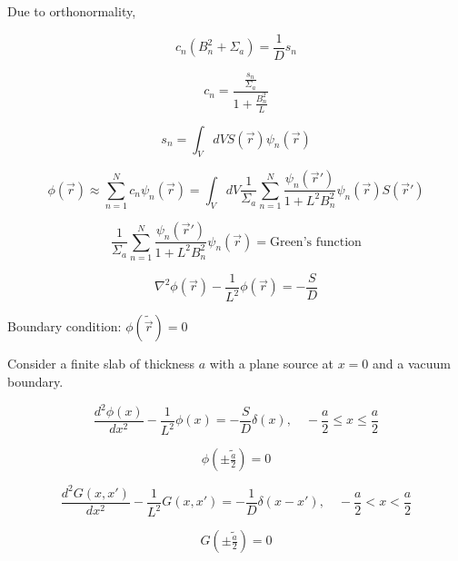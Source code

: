 \documentclass[12pt]{article}
\newcommand{\rvec}{\ensuremath{\vec{r}}}
\begin{document}
Due to orthonormality,

\begin{equation*}
c_n(B_n^2 + \Sigma_a) = \frac{1}{D}s_n
\end{equation*}

\begin{equation*}
c_n = \frac{\frac{s_n}{\Sigma_a}}{1+\frac{B_n^2}{L}}
\end{equation*}

\begin{equation*}
s_n = \int_V dV S(\rvec)\psi_n(\rvec)
\end{equation*}

\begin{equation*}
\phi(\rvec) \approx \sum_{n=1}^N c_n\psi_n(\rvec) = 
\int_V dV \frac{1}{\Sigma_a} \sum_{n=1}^N \frac{\psi_n(\rvec')}{1+L^2B_n^2}\psi_n(\rvec)S(\rvec')
\end{equation*}

\begin{equation*}
\frac{1}{\Sigma_a} \sum_{n=1}^N \frac{\psi_n(\rvec')}{1+L^2B_n^2}\psi_n(\rvec) = \text{Green's function}
\end{equation*}


\begin{equation*}
\nabla^2\phi(\rvec) - \frac{1}{L^2}\phi(\rvec) = -\frac{S}{D}
\end{equation*}

Boundary condition: $\phi(\tilde{\rvec}) = 0$


Consider a finite slab of thickness $a$ with a plane source at $x=0$ and a vacuum boundary.

\begin{equation*}
\frac{d^2\phi(x)}{dx^2} - \frac{1}{L^2}\phi(x) = -\frac{S}{D}\delta(x),\quad
-\frac{a}{2} \leq x \leq \frac{a}{2}
\end{equation*}

\begin{equation*}
\phi\left(\pm\tilde{\tfrac{a}{2}}\right) = 0
\end{equation*}

\begin{equation*}
\frac{d^2G(x,x')}{dx^2} - \frac{1}{L^2}G(x,x') = -\frac{1}{D}\delta(x-x'),\quad
-\frac{a}{2} < x < \frac{a}{2}
\end{equation*}

\begin{equation*}
G\left(\pm\tilde{\tfrac{a}{2}}\right) = 0
\end{equation*}
\end{document}
